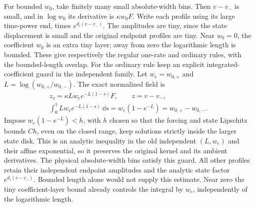 For bounded \(w_0\), take finitely many small absolute-width bins.
Then \(v-v_-\) is small, and in \(\log w_0\) its derivative is
\(\kappa w_0F\).  Write each profile using its large time-power end,
times \(e^{d_i(v-v_-)}\).  The amplitudes are tiny, since the state
displacement is small and the original endpoint profiles are tiny.
Near \(w_0=0\), the coefficient \(w_0\) is an extra tiny layer; away
from zero the logarithmic length is bounded.  These give respectively the
regular one-rate and ordinary rules, with the bounded-length overlap.
For the ordinary rule keep an explicit integrated-coefficient guard in
the independent family.  Let \(w_e=w_{0,+}\) and
\(L=\log(w_{0,+}/w_{0,-})\).  The exact normalized field is
\begin{equation}\label{eq:terminal-bounded-w-guard}
 \begin{gathered}
 z_s=\kappa Lw_e e^{-L(1-s)}F,\qquad z=v-v_-,\\
 \int_0^1 Lw_e e^{-L(1-s)}\,\dd s
 =w_e(1-e^{-L})=w_{0,+}-w_{0,-}.
 \end{gathered}
\end{equation}
Impose \(w_e(1-e^{-L})<h\), with \(h\) chosen so that the forcing
and state Lipschitz bounds \(Ch\), even on the closed range, keep
solutions strictly inside the larger state disk.  This is an analytic
inequality in the old independent \((L,w_e)\) and their affine
exponential, so it preserves the original kernel and its ambient
derivatives.  The physical absolute-width bins satisfy this guard.
All other profiles retain their independent endpoint amplitudes and
the analytic state factor \(e^{d_i(v-v_-)}\).  Bounded length alone
would not supply this estimate.  Near zero the tiny coefficient-layer
bound already controls the integral by \(w_e\), independently of the
logarithmic length.

